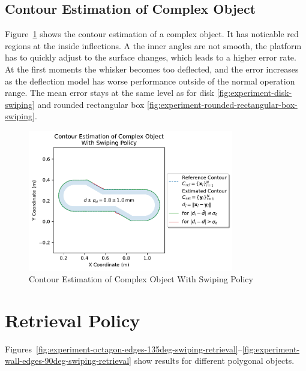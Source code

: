 \subsection{Contour Estimation of Complex Object}
Figure~\ref{fig:experiment-complex-object-swiping} shows the contour estimation of a complex object.
It has noticable red regions at the inside inflections.
A the inner angles are not smooth, the platform has to quickly adjust to the surface changes, which leads to a higher error rate.
At the first moments the whisker becomes too deflected, and the error increases as the deflection model has worse performance outside of the normal operation range.
The mean error stays at the same level as for disk \ref{fig:experiment-disk-swiping} and rounded rectangular box \ref{fig:experiment-rounded-rectangular-box-swiping}.

\begin{figure}[htb]
    \centering
    \includegraphics[width=0.8\textwidth]{figures/experiments/complex-object-swiping}
    \caption{Contour Estimation of Complex Object With Swiping Policy}
    \label{fig:experiment-complex-object-swiping}
\end{figure}


\section{Retrieval Policy}
Figures~\ref{fig:experiment-octagon-edges-135deg-swiping-retrieval}--\ref{fig:experiment-wall-edges-90deg-swiping-retrieval} show results for different polygonal objects.

